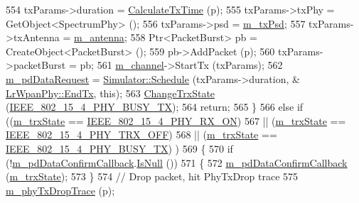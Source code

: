 \begin{DoxyCode}
554           txParams->duration = \hyperlink{classns3_1_1LrWpanPhy_a18e8110831088f2f0ef3e55b9400526e}{CalculateTxTime} (p);
555           txParams->txPhy = GetObject<SpectrumPhy> ();
556           txParams->psd = \hyperlink{classns3_1_1LrWpanPhy_a136f3eddb97dc50b4689df6a36df1f76}{m\_txPsd};
557           txParams->txAntenna = \hyperlink{classns3_1_1LrWpanPhy_a190f9ce3b27fed0de2be87412387f8ba}{m\_antenna};
558           Ptr<PacketBurst> pb = CreateObject<PacketBurst> ();
559           pb->AddPacket (p);
560           txParams->packetBurst = pb;
561           \hyperlink{classns3_1_1LrWpanPhy_a6ea4a904afe3b256bc001c40efe496e1}{m\_channel}->StartTx (txParams);
562           \hyperlink{classns3_1_1LrWpanPhy_ac25e1b499978dc6ad31f3c425f6e261a}{m\_pdDataRequest} = \hyperlink{classns3_1_1Simulator_a671882c894a08af4a5e91181bf1eec13}{Simulator::Schedule} (txParams->duration, &
      \hyperlink{classns3_1_1LrWpanPhy_afbb3b6c22ee0925f9019b703c02d3ed3}{LrWpanPhy::EndTx}, \textcolor{keyword}{this});
563           \hyperlink{classns3_1_1LrWpanPhy_a149987679698c2878d941fac1238c41a}{ChangeTrxState} (\hyperlink{group__lr-wpan_gga6494269d13d45c511a07b7ccbb1de754a87f658959801356265b8c28a85569b15}{IEEE\_802\_15\_4\_PHY\_BUSY\_TX});
564           \textcolor{keywordflow}{return};
565         \}
566       \textcolor{keywordflow}{else} \textcolor{keywordflow}{if} ((\hyperlink{classns3_1_1LrWpanPhy_a316704a4eb96e04f4b960ba3577fe0ce}{m\_trxState} == \hyperlink{group__lr-wpan_gga6494269d13d45c511a07b7ccbb1de754a9480f69fea1a74b7961ed74d6b3e2f9e}{IEEE\_802\_15\_4\_PHY\_RX\_ON})
567                || (\hyperlink{classns3_1_1LrWpanPhy_a316704a4eb96e04f4b960ba3577fe0ce}{m\_trxState} == \hyperlink{group__lr-wpan_gga6494269d13d45c511a07b7ccbb1de754a4c0fd3882b68301deb8ce5b03109058f}{IEEE\_802\_15\_4\_PHY\_TRX\_OFF})
568                || (\hyperlink{classns3_1_1LrWpanPhy_a316704a4eb96e04f4b960ba3577fe0ce}{m\_trxState} == \hyperlink{group__lr-wpan_gga6494269d13d45c511a07b7ccbb1de754a87f658959801356265b8c28a85569b15}{IEEE\_802\_15\_4\_PHY\_BUSY\_TX}) )
569         \{
570           \textcolor{keywordflow}{if} (!\hyperlink{classns3_1_1LrWpanPhy_a6f736d7cb72829ef100315c1b8f6ea05}{m\_pdDataConfirmCallback}.\hyperlink{classns3_1_1Callback_aa8e27826badbf37f84763f36f70d9b54}{IsNull} ())
571             \{
572               \hyperlink{classns3_1_1LrWpanPhy_a6f736d7cb72829ef100315c1b8f6ea05}{m\_pdDataConfirmCallback} (\hyperlink{classns3_1_1LrWpanPhy_a316704a4eb96e04f4b960ba3577fe0ce}{m\_trxState});
573             \}
574           \textcolor{comment}{// Drop packet, hit PhyTxDrop trace}
575           \hyperlink{classns3_1_1LrWpanPhy_ac8651acbf8f744b8442c05a490a35720}{m\_phyTxDropTrace} (p);

\end{DoxyCode}
